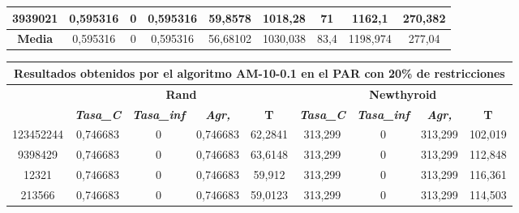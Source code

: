 \documentclass[12pt, spanish]{article}
\begin{document}
\begin{table}[H]
\begin{tabular}{|c|c|c|c|c|c|c|c|c|}
3939021           & 0,595316                  & 0                           & 0,595316               & 59,8578    & 1018,28                   & 71                          & 1162,1                 & 270,382    \\ \hline
\textbf{Media}    & 0,595316                  & 0                           & 0,595316               & 56,68102   & 1030,038                  & 83,4                        & 1198,974               & 277,04     \\ \hline
\end{tabular}
\end{table}



\begin{table}[H]
\footnotesize
\begin{tabular}{|c|c|c|c|c|c|c|c|c|}
\hline
\multicolumn{9}{|c|}{\textbf{Resultados obtenidos por el algoritmo AM-10-0.1 en el PAR con 20\% de restricciones}}                                                                                                \\ \hline
\multirow{2}{*}{} & \multicolumn{4}{c|}{\textbf{Rand}}                                                            & \multicolumn{4}{c|}{\textbf{Newthyroid}}                                                      \\ \cline{2-9} 
                  & \textit{\textbf{Tasa\_C}} & \textit{\textbf{Tasa\_inf}} & \textit{\textbf{Agr,}} & \textbf{T} & \textit{\textbf{Tasa\_C}} & \textit{\textbf{Tasa\_inf}} & \textit{\textbf{Agr,}} & \textbf{T} \\ \hline
123452244         & 0,746683                      & 0                           & 0,746683                   & 62,2841       & 313,299                   & 0                           & 313,299                & 102,019    \\ \hline
9398429           & 0,746683                      & 0                           & 0,746683                  & 63,6148       & 313,299                   & 0                           & 313,299                & 112,848    \\ \hline
12321             & 0,746683                      & 0                           & 0,746683                   & 59,912       & 313,299                   & 0                           & 313,299                & 116,361    \\ \hline
213566            & 0,746683                      & 0                           & 0,746683                   & 59,0123          & 313,299                   & 0                           & 313,299                & 114,503    \\ \hline

\end{tabular}
\end{table}
\end{document}
